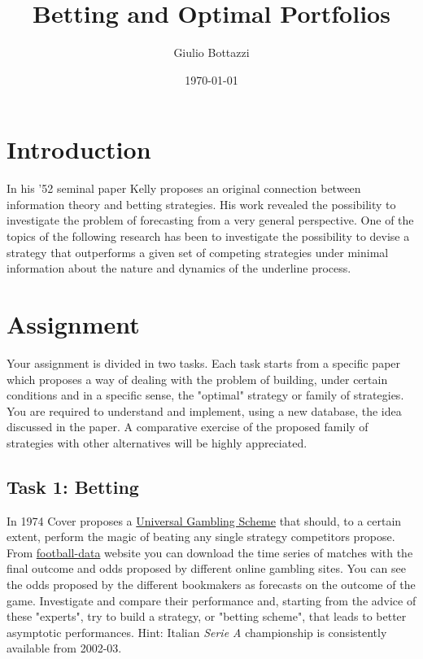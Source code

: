 \documentclass[11pt]{article}
\author{Giulio Bottazzi}
\date{\today}
\title{Betting and Optimal Portfolios}
\begin{document}
\maketitle
\tableofcontents


\section{Introduction}
\label{sec-1}

In his '52 seminal paper Kelly proposes an original connection between
information theory and betting strategies. His work revealed the
possibility to investigate the problem of forecasting from a very
general perspective. One of the topics of the following research has
been to investigate the possibility to devise a strategy that
outperforms a given set of competing strategies under minimal
information about the nature and dynamics of the underline process.
\section{Assignment}
\label{sec-2}

Your assignment is divided in two tasks. Each task starts from a
specific paper which proposes a way of dealing with the problem of
building, under certain conditions and in a specific sense, the
"optimal" strategy or family of strategies. You are required to
understand and implement, using a new database, the idea discussed in
the paper. A comparative exercise of the proposed family of strategies
with other alternatives will be highly appreciated.

\subsection{Task 1: Betting}
\label{sec-2-1}

In 1974 Cover proposes a \href{https://drive.google.com/file/d/0B3G1Di9qZKBmVGhtendHaWtheWM/view?usp=sharing}{Universal Gambling Scheme} that should, to a
certain extent, perform the magic of beating any single strategy
competitors propose. From \href{http://www.football-data.co.uk}{football-data} website you can download the
time series of matches with the final outcome and odds proposed by
different online gambling sites. You can see the odds proposed by the
different bookmakers as forecasts on the outcome of the
game. Investigate and compare their performance and, starting from the
advice of these "experts", try to build a strategy, or "betting
scheme", that leads to better asymptotic performances. Hint: Italian
\emph{Serie A} championship is consistently available from 2002-03.
\end{document}
